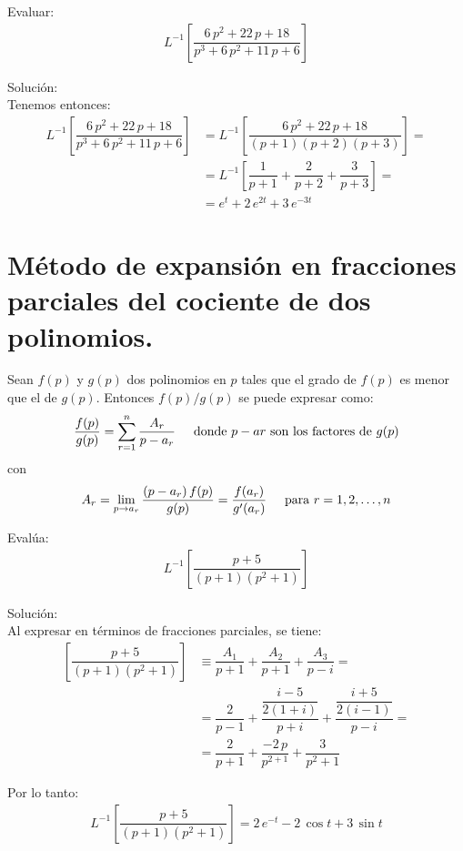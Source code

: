 \begin{ejemplo} Evaluar:
\begin{align*}
L^{-1} \left[ \dfrac{6 \, p^{2} + 22 \, p + 18}{p^{3} + 6 \, p^{2} + 11 \, p + 6} \right]
\end{align*}

\noindent Solución:
\\[0.5em]
Tenemos entonces:
\begin{align*}
L^{-1} \left[ \dfrac{6 \, p^{2} + 22 \, p + 18}{p^{3} + 6 \, p^{2} + 11 \, p + 6} \right] &= L^{-1} \left[ \dfrac{6 \, p^{2} + 22 \, p + 18}{(p + 1)(p + 2)(p + 3)} \right] = \\[0.5em]
&= L^{-1} \left[ \dfrac{1}{p + 1} + \dfrac{2}{p + 2} + \dfrac{3}{p + 3} \right] = \\[0.5em]
&= e^{t} + 2 \, e^{2 t} + 3 \, e^{- 3 t}
\end{align*}
\end{ejemplo}

\section{Método de expansión en fracciones parciales del cociente de dos polinomios.}

Sean $f (p)$ y $g (p)$ dos polinomios en $p$ tales que el grado de $f (p)$ es menor que el de $g (p)$. Entonces $f (p) / g (p)$ se puede expresar como:
\begin{align*}
\dfrac{f(p)}{g(p)} = \sum_{r=1}^{n} \dfrac{A_{r}}{p - a_{r}} \hspace{0.5cm} \mbox{donde } p - a{r} \mbox{ son los factores de } g(p)
\end{align*}
con
\begin{align*}
A_{r} = \lim_{p \to a_{r}} \dfrac{(p - a_{r}) \, f(p)}{g(p)} = \dfrac{f(a_{r})}{{g}^{\prime}(a_{r})} \hspace{0.5cm} \mbox{para  } r = 1, 2, \ldots, n
\end{align*}

\begin{ejemplo} Evalúa:
\begin{align*}
L^{-1} \left[ \dfrac{p + 5}{(p + 1)(p^{2} + 1)} \right]
\end{align*}

\noindent Solución:
\\[0.5em]
Al expresar en términos de fracciones parciales, se tiene:
\begin{align*}
\left[ \dfrac{p + 5}{(p + 1)(p^{2} + 1)} \right] &\equiv \dfrac{A_{1}}{p + 1} + \dfrac{A_{2}}{p + 1} + \dfrac{A_{3}}{p - i} = \\[0.5em]
&= \dfrac{2}{p -1} + \dfrac{\dfrac{i - 5}{2(1 + i)}}{p + i} + \dfrac{\dfrac{i + 5}{2(i - 1)}}{p - i} = \\[0.5em]
&= \dfrac{2}{p + 1} + \dfrac{-2 \, p}{p^{2 + 1}} + \dfrac{3}{p^2 + 1}
\end{align*}

Por lo tanto:
\begin{align*}
L^{-1} \left[ \dfrac{p + 5}{(p + 1)(p^{2} + 1)} \right] = 2 \, e^{-t} - 2 \, \cos t +  3 \, \sin t
\end{align*}
\end{ejemplo}

